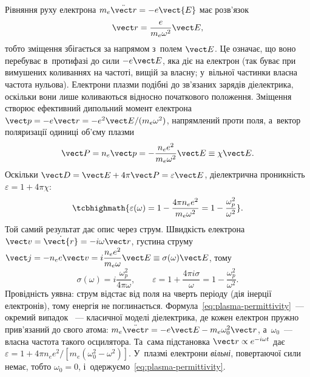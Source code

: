 Рівняння руху електрона $m_e\ddot{\vect r}=-e\vect{E}$ має розв'язок
\begin{equation*}
	\vect r=\frac{e}{m_e\omega^2}\vect E,
\end{equation*}
тобто зміщення збігається за напрямом з~полем $\vect E$. Це означає, що воно перебуває
в~протифазі до сили $-e\vect E$, яка діє на електрон (так буває при вимушених
коливаннях на частоті, вищій за власну; у~вільної частинки власна частота нульова). Електрони плазми подібні до
зв'язаних зарядів діелектрика, оскільки вони лише коливаються відносно початкового
положення. Зміщення створює ефективний дипольний момент електрона $\vect p=-e\vect
r=-e^2\vect E/(m_e\omega^2)$, напрямлений проти поля, а~вектор поляризації одиниці об'єму
плазми
\begin{equation*}
	\vect P=n_e\vect p=-\frac{n_ee^2}{m_e\omega^2}\vect E\equiv\chi\vect E.
\end{equation*}
Оскільки $\vect D=\vect E+4\pi\vect P=\varepsilon\vect E$, діелектрична проникність
$\varepsilon=1+4\pi\chi$:
\begin{equation}\label{eq:plasma-permittivity}
	\tcbhighmath{\varepsilon(\omega)=1-\frac{4\pi n_ee^2}{m_e\omega^2}=1-\frac{\omega_p^2}{\omega^2}}.
\end{equation}
Той самий результат дає опис через струм. Швидкість електрона $\vect
v=\dot{\vect{r}}=-i\omega\vect r$, густина струму $\vect j=-n_ee\vect
v=i\dfrac{n_ee^2}{m_e\omega}\vect E\equiv\sigma(\omega)\vect E$, тому
\begin{equation}\label{eq:sigma-collisionless}
	\sigma(\omega)=i\frac{\omega_p^2}{4\pi\omega},\qquad
	\varepsilon=1+\frac{4\pi i\sigma}{\omega}=1-\frac{\omega_p^2}{\omega^2}.
\end{equation}
Провідність уявна: струм відстає від поля на чверть періоду (дія інерції електронів), тому
енергія не поглинається. Формула~\eqref{eq:plasma-permittivity}~--- окремий випадок ~--- класичної моделі діелектрика, де кожен електрон пружно прив'язаний до свого
атома: $m_e\ddot{\vect r}=-e\vect E-m_e\omega_0^2\vect r$, а~$\omega_0$~--- власна частота
такого осцилятора. Та~сама підстановка $\vect r\propto e^{-i\omega t}$ дає
$\varepsilon=1+4\pi n_ee^2/[m_e(\omega_0^2-\omega^2)]$. У~плазмі електрони \emph{вільні},
повертаючої сили немає, тобто $\omega_0=0$, і~одержуємо~\eqref{eq:plasma-permittivity}.

